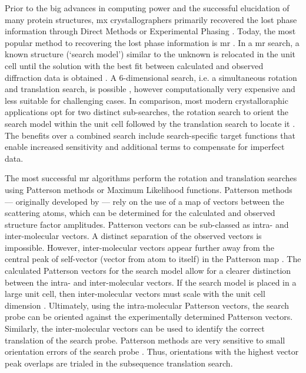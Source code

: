 Prior to the big advances in computing power and the successful elucidation of many protein structures, \gls{mx} crystallographers primarily recovered the lost phase information through Direct Methods or Experimental Phasing \cite{Rupp2010-nc}. Today, the most popular method to recovering the lost phase information is \gls{mr} \cite{Rossmann2001-yw,Rossmann1990-am}. In a \Gls{mr} search, a known structure (`search model') similar to the unknown is relocated in the unit cell until the solution with the best fit between calculated and observed diffraction data is obtained \cite{Rupp2010-nc}. A 6-dimensional search, i.e. a simultaneous rotation and translation search, is possible \cite{Kissinger1999-ho,Glykos2000-gc,Read2001-nu}, however computationally very expensive and less suitable for challenging cases. In comparison, most modern crystalloraphic applications opt for two distinct sub-searches, the rotation search to orient the search model within the unit cell followed by the translation search to locate it \cite{Rupp2010-nc}. The benefits over a combined search include search-specific target functions that enable increased sensitivity and additional terms to compensate for imperfect data. 

The most successful \gls{mr} algorithms perform the rotation and translation searches using Patterson methods or Maximum Likelihood functions. Patterson methods --- originally developed by \textcite{Rossmann1962-ou} --- rely on the use of a map of vectors between the scattering atoms, which can be determined for the calculated and observed structure factor amplitudes. Patterson vectors can be sub-classed as intra- and inter-molecular vectors. A distinct separation of the observed vectors is impossible. However, inter-molecular vectors appear further away from the central peak of self-vector (vector from atom to itself) in the Patterson map \cite{Rupp2010-nc}. The calculated Patterson vectors for the search model allow for a clearer distinction between the intra- and inter-molecular vectors. If the search model is placed in a large unit cell, then inter-molecular vectors must scale with the unit cell dimension \cite{Rupp2010-nc}. Ultimately, using the intra-molecular Patterson vectors, the search probe can be oriented against the experimentally determined Patterson vectors. Similarly, the inter-molecular vectors can be used to identify the correct translation of the search probe. Patterson methods are very sensitive to small orientation errors of the search probe \cite{Rupp2010-nc}. Thus, orientations with the highest vector peak overlaps are trialed in the subsequence translation search.

